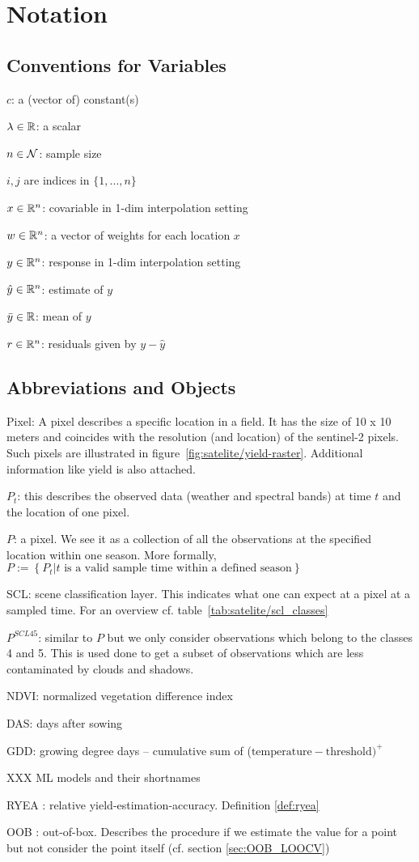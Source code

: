 \chapter*{Notation}
\label{c:Notation}

\section*{Conventions for Variables}
$c$: a (vector of) constant(s)

$\lambda \in \mathbb{R}$: a scalar

$n\in \operatorname{\mathcal{N}}$: sample size

$i,j$ are indices in $\{1,\dots,n\}$

$x\in \mathbb{R}^n$: covariable in 1-dim interpolation setting

$w \in \mathbb{R}^n$: a vector of weights for each location $x$

$y\in \mathbb{R}^n$: response in 1-dim interpolation setting

$\hat y\in \mathbb{R}^n$: estimate of $y$

$\bar y\in \mathbb{R}$: mean of $y$

$r \in \mathbb{R}^n$: residuals given by $y - \hat y$


\section*{Abbreviations and Objects}

Pixel: A pixel describes a specific location in a field. It has the size of 10 x 10 meters and coincides with the resolution (and location) of the sentinel-2 pixels. Such pixels are illustrated in figure~\ref{fig:satelite/yield-raster}. Additional information like yield is also attached.

$P_t$: this describes the observed data (weather and spectral bands) at time $t$ and the location of one pixel. 

$P$: a pixel. We see it as a collection of all the observations at the specified location within one season. More formally, $P := \left\{P_t | t\text{ is a valid sample time within a defined season}\right\}$

SCL: scene classification layer. This indicates what one can expect at a pixel at a sampled time. For an overview cf. table~\ref{tab:satelite/scl_classes}

$P^{SCL45}$: similar to $P$ but we only consider observations which belong to the classes 4 and 5. This is used done to get a subset of observations which are less contaminated by clouds and shadows.

NDVI: normalized vegetation difference index

DAS: days after sowing

GDD: growing degree days -- cumulative sum of ($\text{temperature}-\text{threshold})^+$

XXX ML models and their shortnames

RYEA : relative yield-estimation-accuracy. Definition \ref{def:ryea}

OOB : out-of-box. Describes the procedure if we estimate the value for a point but not consider the point itself (cf. section \ref{sec:OOB_LOOCV})
